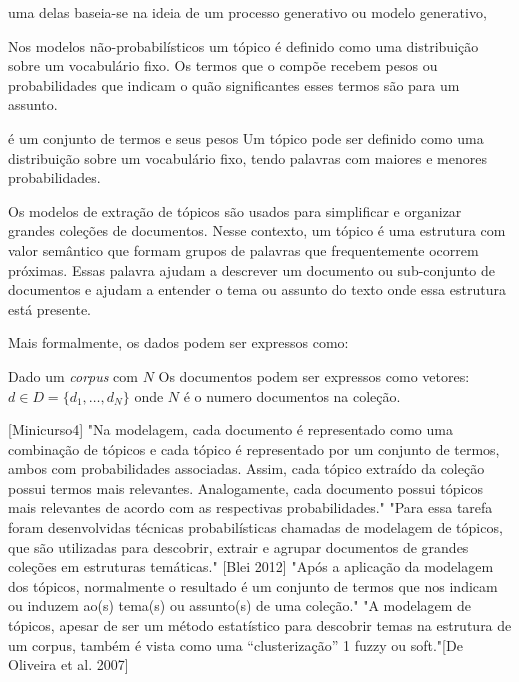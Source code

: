 

uma delas baseia-se na ideia de um processo generativo ou modelo generativo, 




Nos modelos não-probabilísticos um tópico é definido como uma distribuição sobre um vocabulário fixo. Os termos que o compõe recebem pesos ou probabilidades que indicam o quão significantes esses termos são para um assunto.



é um conjunto de termos e seus pesos 
Um tópico pode ser definido como uma distribuição sobre um vocabulário fixo, tendo palavras com maiores e menores probabilidades.

Os modelos de extração de tópicos são usados para simplificar e organizar grandes coleções de documentos. Nesse contexto, um tópico é uma estrutura com valor semântico que formam grupos de palavras que frequentemente ocorrem próximas. Essas palavra ajudam a descrever um documento ou sub-conjunto de documentos e ajudam a entender o tema ou assunto do texto onde essa estrutura está presente.


Mais formalmente, os dados podem ser expressos como:

Dado um \textit{corpus} com $N$ 
Os documentos podem ser expressos como vetores: $ d \in D = \{d_1,\dots,d_N\}$ onde $N$ é o numero documentos na coleção. 



[Minicurso4] 
"Na modelagem, cada documento é representado como uma combinação de tópicos e cada tópico é representado por um conjunto de termos, ambos com probabilidades associadas. Assim, cada tópico extraído da coleção possui termos mais relevantes. Analogamente, cada documento possui tópicos mais relevantes de acordo com as respectivas probabilidades."
"Para essa tarefa foram desenvolvidas técnicas probabilísticas chamadas de modelagem de tópicos, que são utilizadas para descobrir, extrair e agrupar documentos de grandes coleções em estruturas temáticas." [Blei 2012]
"Após a aplicação da modelagem dos tópicos, normalmente o resultado é um conjunto de termos que nos indicam ou induzem ao(s) tema(s) ou assunto(s) de uma coleção."
"A modelagem de tópicos, apesar de ser um método estatístico para descobrir temas na estrutura de um corpus, também é vista como uma “clusterização” 1 fuzzy ou soft."[De Oliveira et al. 2007]

